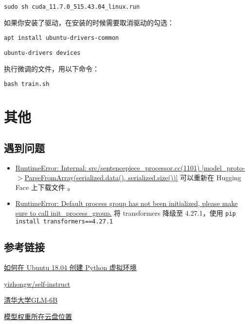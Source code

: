\documentclass{article}
\begin{document}
\verb|sudo sh cuda_11.7.0_515.43.04_linux.run|

如果你安装了驱动，在安装的时候需要取消驱动的勾选：

\verb|apt install ubuntu-drivers-common|

\verb|ubuntu-drivers devices|

执行微调的文件，用以下命令：

\verb|bash train.sh|

\section{其他}
\subsection{遇到问题}
\begin{itemize}
    \item \href{https://github.com/THUDM/ChatGLM2-6B/issues/21}{RuntimeError: Internal: src/sentencepiece\_processor.cc(1101) [model\_proto-$>$ParseFromArray(serialized.data(), serialized.size())]} 可以重新在 Hugging Face 上下载文件 。
    \item \href{https://github.com/THUDM/ChatGLM2-6B/issues/208}{RuntimeError: Default process group has not been initialized, please make sure to call init\_process\_group.} 将 transformers 降级至 4.27.1，使用 \verb|pip install transformers==4.27.1|
\end{itemize}
\subsection{参考链接}
\href{https://www.myfreax.com/how-to-create-python-virtual-environments-on-ubuntu-18-04/}{如何在 Ubuntu 18.04 创建 Python 虚拟环境}

\href{https://github.com/yizhongw/self-instruct/blob/main/human_eval/README.md}{yizhongw/self-instruct}

\href{https://github.com/THUDM/ChatGLM-6B}{清华大学GLM-6B}

\href{https://cloud.tsinghua.edu.cn/d/fb9f16d6dc8f482596c2/}{模型权重所在云盘位置}
\end{document}

